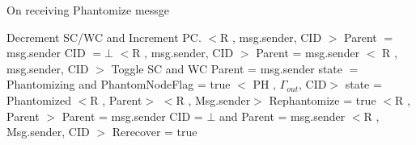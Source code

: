 	
\begin{algorithm}[H]
\caption{On receiving Phantomize messge}
\label{Phantom message received}
\scriptsize
\begin{algorithmic}[1]
\State Decrement SC/WC and Increment PC.
			\State $<$R , msg.sender, CID $>$
		\Else
			\State Parent $=$ msg.sender
			\State CID $= \bot$ 
		\EndIf
	\Else
		\State $<$R , msg.sender, CID $>$
	\EndIf
{}
	\State Parent = msg.sender
	\State $<$ R , msg.sender, CID $>$
	\State Toggle SC and WC
	\State Parent = msg.sender
	\State state $=$ Phantomizing and PhantomNodeFlag = true
	\State $<$ PH , $\Gamma_{out}$, CID$>$
		\State state = Phantomized
		\State $<$R , Parent$>$
	\EndIf
{}
		\State $<$R , Msg.sender$>$
	\Else
  	\State Rephantomize = true
			\State $<$R , Parent $>$
			\State Parent = msg.sender
		\Else
				\State CID = $\bot$ and Parent = msg.sender
			\Else
				\State $<$R , Msg.sender, CID $>$
				\State Rerecover = true
			\EndIf
		\EndIf
	\EndIf
\EndIf
\EndProcedure
\end{algorithmic}
\end{algorithm}	
	
